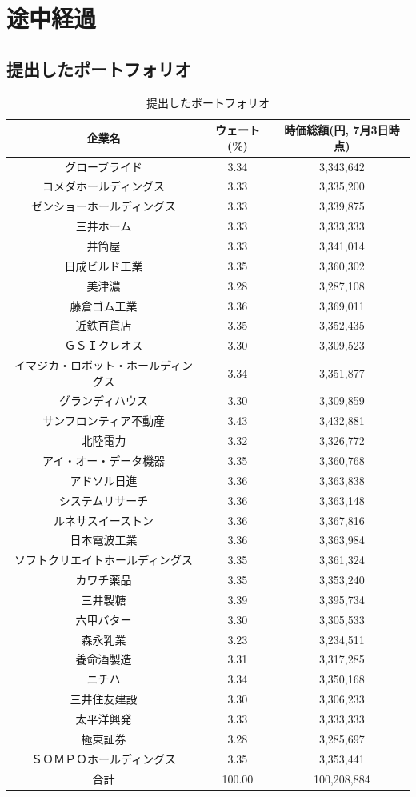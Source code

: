 \documentclass[11pt]{jreport}
\begin{document}
\chapter{途中経過}
\section{提出したポートフォリオ}

\begin{table}[H]
\begin{center}
\begin{tabular}{|c|c|c|}
\hline
企業名 & ウェート(\%) & 時価総額(円, 7月3日時点)\\
\hline
\hline
グローブライド	&3.34&3,343,642\\
コメダホールディングス&3.33	&3,335,200\\
ゼンショーホールディングス&3.33&	3,339,875\\
三井ホーム&3.33&3,333,333\\
井筒屋&3.33	&3,341,014\\
日成ビルド工業&3.35&3,360,302\\
美津濃&3.28	&3,287,108\\
藤倉ゴム工業	&	3.36	&	3,369,011	\\
近鉄百貨店	&	3.35	&	3,352,435	\\
ＧＳＩクレオス	&	3.30	&	3,309,523	\\
イマジカ・ロボット・ホールディングス	&	3.34	&3,351,877\\
グランディハウス	&	3.30	&	3,309,859	\\
サンフロンティア不動産	&	3.43	&	3,432,881	\\
北陸電力	&	3.32	&	3,326,772	\\
アイ・オー・データ機器	&	3.35	&	3,360,768	\\
アドソル日進	&	3.36	&	3,363,838	\\
システムリサーチ	&	3.36	&	3,363,148	\\
ルネサスイーストン	&	3.36	&	3,367,816	\\
日本電波工業	&	3.36	&	3,363,984	\\
ソフトクリエイトホールディングス	&	3.35	&3,361,324\\
カワチ薬品	&	3.35	&	3,353,240	\\
三井製糖	&	3.39	&	3,395,734	\\
六甲バター	&	3.30	&	3,305,533	\\
森永乳業	&	3.23	&	3,234,511	\\
養命酒製造	&	3.31	&	3,317,285	\\
ニチハ	&	3.34	&	3,350,168	\\
三井住友建設	&	3.30	&	3,306,233	\\
太平洋興発	&	3.33	&	3,333,333	\\
極東証券	&	3.28	&	3,285,697	\\
ＳＯＭＰＯホールディングス	&	3.35	&	3,353,441\\
\hline
\hline
合計& 100.00 &  100,208,884\\
\hline
\end{tabular}
\end{center}
\caption{提出したポートフォリオ}
\label{tbl:port1}
\end{table}
\end{document}
